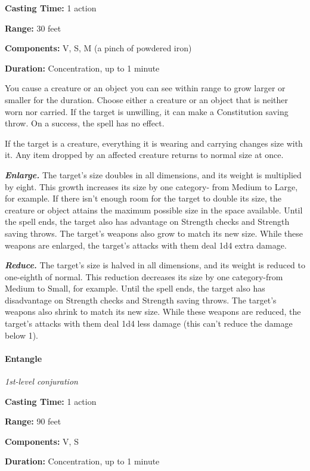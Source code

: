 \documentclass[
]{article}
\begin{document}
\textbf{Casting Time:} 1 action

\textbf{Range:} 30 feet

\textbf{Components:} V, S, M (a pinch of powdered iron)

\textbf{Duration:} Concentration, up to 1 minute

You cause a creature or an object you can see within range to grow
larger or smaller for the duration. Choose either a creature or an
object that is neither worn nor carried. If the target is unwilling, it
can make a Constitution saving throw. On a success, the spell has no
effect.

If the target is a creature, everything it is wearing and carrying
changes size with it. Any item dropped by an affected creature returns
to normal size at once.

\emph{\textbf{Enlarge.}} The target's size doubles in all dimensions,
and its weight is multiplied by eight. This growth increases its size by
one category- from Medium to Large, for example. If there isn't enough
room for the target to double its size, the creature or object attains
the maximum possible size in the space available. Until the spell ends,
the target also has advantage on Strength checks and Strength saving
throws. The target's weapons also grow to match its new size. While
these weapons are enlarged, the target's attacks with them deal 1d4
extra damage.

\emph{\textbf{Reduce.}} The target's size is halved in all dimensions,
and its weight is reduced to one-eighth of normal. This reduction
decreases its size by one category-from Medium to Small, for example.
Until the spell ends, the target also has disadvantage on Strength
checks and Strength saving throws. The target's weapons also shrink to
match its new size. While these weapons are reduced, the target's
attacks with them deal 1d4 less damage (this can't reduce the damage
below 1).

\hypertarget{entangle}{%
\paragraph{Entangle}\label{entangle}}

\emph{1st-level conjuration}

\textbf{Casting Time:} 1 action

\textbf{Range:} 90 feet

\textbf{Components:} V, S

\textbf{Duration:} Concentration, up to 1 minute
\end{document}
